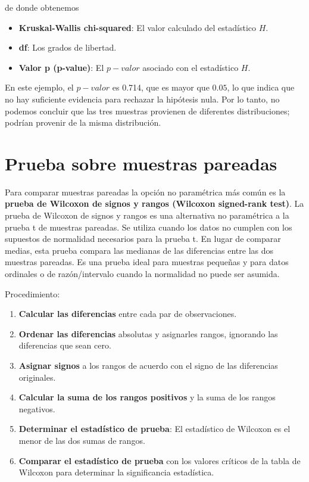 \documentclass[
  letterpaper,
  DIV=11,
  numbers=noendperiod]{scrreprt}
\providecommand{\tightlist}{%
  \setlength{\itemsep}{0pt}\setlength{\parskip}{0pt}}\usepackage{longtable,booktabs,array}
\begin{document}
\begin{tcolorbox}
de donde obtenemos

\begin{itemize}
\tightlist
\item
  \textbf{Kruskal-Wallis chi-squared}: El valor calculado del
  estadístico \(H\).
\item
  \textbf{df}: Los grados de libertad.
\item
  \textbf{Valor p (p-value)}: El \(p-valor\) asociado con el estadístico
  \(H\).
\end{itemize}

En este ejemplo, el \(p-valor\) es 0.714, que es mayor que \(0.05\), lo
que indica que no hay suficiente evidencia para rechazar la hipótesis
nula. Por lo tanto, no podemos concluir que las tres muestras provienen
de diferentes distribuciones; podrían provenir de la misma distribución.

\end{tcolorbox}

\hypertarget{prueba-sobre-muestras-pareadas}{%
\section{Prueba sobre muestras
pareadas}\label{prueba-sobre-muestras-pareadas}}

Para comparar muestras pareadas la opción no paramétrica más común es la
\textbf{prueba de Wilcoxon de signos y rangos (Wilcoxon signed-rank
test)}. La prueba de Wilcoxon de signos y rangos es una alternativa no
paramétrica a la prueba t de muestras pareadas. Se utiliza cuando los
datos no cumplen con los supuestos de normalidad necesarios para la
prueba t. En lugar de comparar medias, esta prueba compara las medianas
de las diferencias entre las dos muestras pareadas. Es una prueba ideal
para muestras pequeñas y para datos ordinales o de razón/intervalo
cuando la normalidad no puede ser asumida.

Procedimiento:

\begin{enumerate}
\def\labelenumi{\arabic{enumi}.}
\item
  \textbf{Calcular las diferencias} entre cada par de observaciones.
\item
  \textbf{Ordenar las diferencias} absolutas y asignarles rangos,
  ignorando las diferencias que sean cero.
\item
  \textbf{Asignar signos} a los rangos de acuerdo con el signo de las
  diferencias originales.
\item
  \textbf{Calcular la suma de los rangos positivos} y la suma de los
  rangos negativos.
\item
  \textbf{Determinar el estadístico de prueba}: El estadístico de
  Wilcoxon es el menor de las dos sumas de rangos.
\item
  \textbf{Comparar el estadístico de prueba} con los valores críticos de
  la tabla de Wilcoxon para determinar la significancia estadística.
\end{enumerate}
\end{document}

